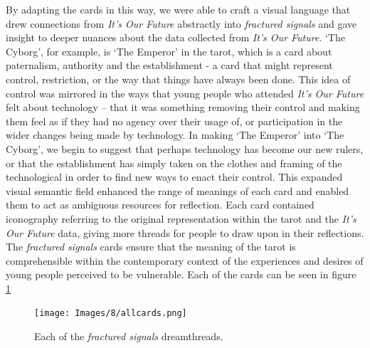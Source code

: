 By adapting the cards in this way, we were able to craft a visual language that drew connections from \emph{It's Our Future} abstractly into \emph{fractured signals} and gave insight to deeper nuances about the data collected from \emph{It's Our Future}. ‘The Cyborg’, for example, is ‘The Emperor’ in the tarot, which is a card about paternalism, authority and the establishment - a card that might represent control, restriction, or the way that things have always been done. This idea of control was mirrored in the ways that young people who attended \textit{It’s Our Future} felt about technology – that it was something removing their control and making them feel as if they had no agency over their usage of, or participation in the wider changes being made by technology. In making ‘The Emperor’ into ‘The Cyborg’, we begin to suggest that perhaps technology has become our new rulers, or that the establishment has simply taken on the clothes and framing of the technological in order to find new ways to enact their control. This expanded visual semantic field enhanced the range of meanings of each card and enabled them to act as ambiguous resources for reflection. Each card contained iconography referring to the original representation within the tarot and the \textit{It's Our Future} data, giving more threads for people to draw upon in their reflections. The\textit{ fractured signals} cards ensure that the meaning of the tarot is comprehensible within the contemporary context of the experiences and desires of young people perceived to be vulnerable. Each of the cards can be seen in figure \ref{fig:dreamthreads}

\begin{figure}
    \centering
    \texttt{[image: Images/8/allcards.png]}
    \caption{Each of the \textit{fractured signals} dreamthreads.}
    \label{fig:dreamthreads}
\end{figure}

